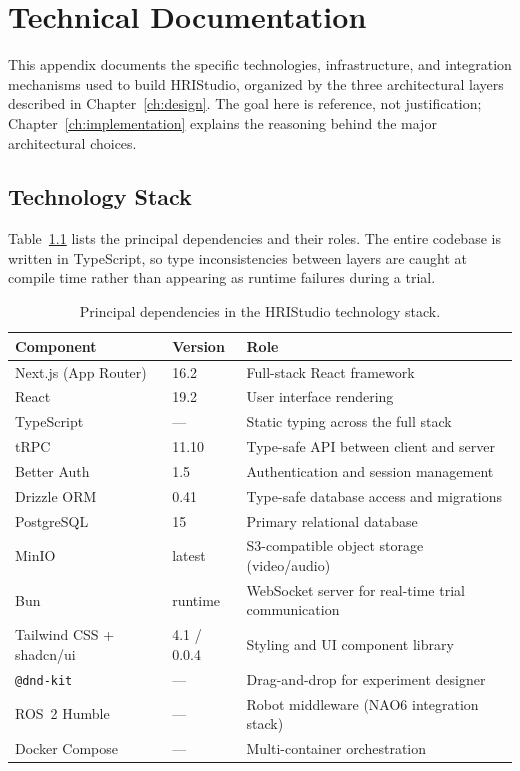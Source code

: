 \chapter{Technical Documentation}
\label{app:tech_docs}

This appendix documents the specific technologies, infrastructure, and integration mechanisms used to build HRIStudio, organized by the three architectural layers described in Chapter~\ref{ch:design}. The goal here is reference, not justification; Chapter~\ref{ch:implementation} explains the reasoning behind the major architectural choices.

\section{Technology Stack}

Table~\ref{tbl:tech-stack} lists the principal dependencies and their roles. The entire codebase is written in TypeScript, so type inconsistencies between layers are caught at compile time rather than appearing as runtime failures during a trial.

\begin{table}[htbp]
\centering
\footnotesize
\begin{tabular}{|l|l|l|}
\hline
\textbf{Component} & \textbf{Version} & \textbf{Role} \\
\hline
Next.js (App Router) & 16.2 & Full-stack React framework \\
\hline
React & 19.2 & User interface rendering \\
\hline
TypeScript & --- & Static typing across the full stack \\
\hline
tRPC & 11.10 & Type-safe API between client and server \\
\hline
Better Auth & 1.5 & Authentication and session management \\
\hline
Drizzle ORM & 0.41 & Type-safe database access and migrations \\
\hline
PostgreSQL & 15 & Primary relational database \\
\hline
MinIO & latest & S3-compatible object storage (video/audio) \\
\hline
Bun & runtime & WebSocket server for real-time trial communication \\
\hline
Tailwind CSS + shadcn/ui & 4.1 / 0.0.4 & Styling and UI component library \\
\hline
\texttt{@dnd-kit} & --- & Drag-and-drop for experiment designer \\
\hline
ROS~2 Humble & --- & Robot middleware (NAO6 integration stack) \\
\hline
Docker Compose & --- & Multi-container orchestration \\
\hline
\end{tabular}
\caption{Principal dependencies in the HRIStudio technology stack.}
\label{tbl:tech-stack}
\end{table}

